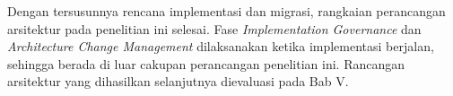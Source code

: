 Dengan tersusunnya rencana implementasi dan migrasi, rangkaian perancangan arsitektur pada penelitian ini selesai. Fase \textit{Implementation Governance} dan \textit{Architecture Change Management} dilaksanakan ketika implementasi berjalan, sehingga berada di luar cakupan perancangan penelitian ini. Rancangan arsitektur yang dihasilkan selanjutnya dievaluasi pada Bab V.
